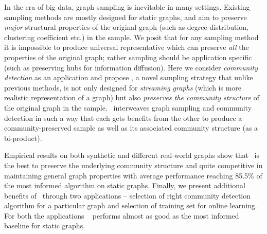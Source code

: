 In the era of big data, graph sampling is inevitable in many settings. Existing sampling methods are mostly designed for static graphs, and aim to preserve {\em major} structural properties of the original graph  (such as degree distribution, clustering coefficient etc.) in the sample. We posit that for any sampling method it is impossible to produce universal representative which can preserve {\em all} the properties of the original graph; rather sampling should be application specific (such as preserving hubs for information diffusion). Here we consider {\em community detection} as an application and  propose \compas, a novel sampling strategy that unlike previous methods, is not only designed for {\em streaming graphs} (which is more realistic representation of a graph) 
but also {\em preserves the community structure} of the original graph in the sample. \compas~interweaves graph sampling and community detection in such a way that each gets benefits from the other to produce a community-preserved sample as well as its associated community structure (as a bi-product). 

Empirical results on both synthetic and different real-world graphs show that \compas~is the best to preserve the underlying community structure and quite competitive in maintaining general graph properties with average performance reaching 85.5\% of the most informed algorithm on static graphs.
Finally, we present additional benefits of \compas~through two applications -- selection of right community detection algorithm for a particular graph 
and selection of training set for online learning. For both the applications \compas~ performs almost as good as the most informed baseline for static graphs. 


